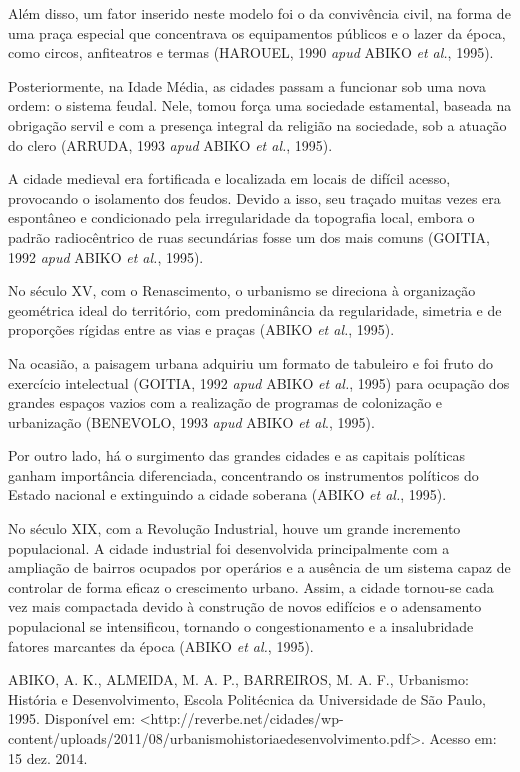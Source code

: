 Além disso, um fator inserido neste modelo foi o da convivência civil, na forma de uma praça especial que concentrava os equipamentos públicos e o lazer da época, como circos, anfiteatros e termas (HAROUEL, 1990 \textit{apud} ABIKO \textit{et al.}, 1995).

Posteriormente, na Idade Média, as cidades passam a funcionar sob uma nova ordem: o sistema feudal. Nele, tomou força uma sociedade estamental, baseada na obrigação servil e com a presença integral da religião na sociedade, sob a atuação do clero (ARRUDA, 1993 \textit{apud} ABIKO \textit{et al.}, 1995).

A cidade medieval era fortificada e localizada em locais de difícil acesso, provocando o isolamento dos feudos. Devido a
isso, seu traçado muitas vezes era espontâneo e condicionado pela irregularidade da topografia local, embora o padrão radiocêntrico de ruas secundárias fosse um dos mais comuns (GOITIA, 1992 \textit{apud} ABIKO \textit{et al.}, 1995).

No século XV, com o Renascimento, o urbanismo se direciona à organização geométrica ideal do território, com predominância da regularidade, simetria e de proporções rígidas entre as vias e praças (ABIKO \textit{et al.}, 1995).

Na ocasião, a paisagem urbana adquiriu um formato de tabuleiro e foi fruto do exercício intelectual (GOITIA, 1992 \textit{apud} ABIKO \textit{et al.}, 1995) para ocupação dos grandes espaços vazios com a realização de programas de colonização e urbanização (BENEVOLO, 1993 \textit{apud} ABIKO \textit{et al}., 1995).

Por outro lado, há o surgimento das grandes cidades e as capitais políticas ganham importância diferenciada, concentrando os instrumentos políticos do Estado nacional e extinguindo a cidade soberana (ABIKO \textit{et al.}, 1995).

No século XIX, com a Revolução Industrial, houve um grande incremento populacional. A cidade industrial foi desenvolvida principalmente com a ampliação de bairros ocupados por operários e a ausência de um sistema capaz de controlar de forma eficaz o crescimento urbano. Assim, a cidade tornou-se cada vez mais compactada devido à construção de novos edifícios e o adensamento populacional se intensificou, tornando o congestionamento e a insalubridade fatores marcantes da época (ABIKO \textit{et al.}, 1995).

ABIKO, A. K., ALMEIDA, M. A. P., BARREIROS, M. A. F., Urbanismo: História e
Desenvolvimento, Escola Politécnica da Universidade de São Paulo, 1995. Disponível
em: <http://reverbe.net/cidades/wp-content/uploads/2011/08/urbanismohistoriaedesenvolvimento.pdf>.
Acesso em: 15 dez. 2014.

